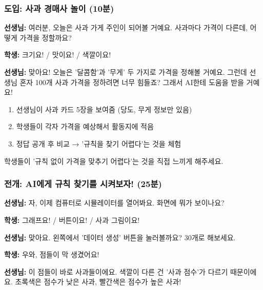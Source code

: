 \documentclass[12pt,a4paper]{article}
\begin{document}
\subsubsection{도입: 사과 경매사 놀이 (10분)}

\begin{tcolorbox}[colback=lightgreen,colframe=applegreen,title=\textbf{【사과 경매사 활동】}]
 \textbf{선생님:} 여러분, 오늘은 사과 가게 주인이 되어볼 거예요. 사과마다 가격이 다른데, 어떻게 가격을 정할까요?

\vspace{0.2cm}
 \textbf{학생:} 크기요! / 맛이요! / 색깔이요!

\vspace{0.2cm}
 \textbf{선생님:} 맞아요! 오늘은 '달콤함'과 '무게' 두 가지로 가격을 정해볼 거예요. 그런데 선생님 혼자 100개 사과 가격을 정하려면 너무 힘들죠? 그래서 AI한테 도움을 받을 거예요!
\end{tcolorbox}

\begin{tcolorbox}[colback=lightyellow,colframe=orange,title=\textbf{\texttwemoji{bullseye} 활동 포인트}]
\begin{enumerate}
    \item 선생님이 사과 카드 5장을 보여줌 (당도, 무게 정보만 있음)
    \item 학생들이 각자 가격을 예상해서 활동지에 적음
    \item 정답 공개 후 비교 → '규칙을 찾기 어렵다'는 것을 체험
\end{enumerate}

학생들이 '규칙 없이 가격을 맞추기 어렵다'는 것을 직접 느끼게 해주세요.
\end{tcolorbox}

\subsubsection{전개: AI에게 규칙 찾기를 시켜보자! (25분)}

\begin{tcolorbox}[colback=lightgray,colframe=gray,title=\textbf{【활동 1: 시뮬레이터 탐험 - 10분】}]
 \textbf{선생님:} 자, 이제 컴퓨터로 시뮬레이터를 열어봐요. 화면에 뭐가 보이나요?

\vspace{0.2cm}
 \textbf{학생:} 그래프요! / 버튼이요! / 사과 그림이요!

\vspace{0.2cm}
 \textbf{선생님:} 맞아요. 왼쪽에서 '데이터 생성' 버튼을 눌러볼까요? 30개로 해보세요.

\vspace{0.2cm}
 \textbf{학생:} 우와, 점들이 막 생겼어요!

\vspace{0.2cm}
 \textbf{선생님:} 이 점들이 바로 사과들이에요. 색깔이 다른 건 '사과 점수'가 다르기 때문이에요. 초록색은 점수가 낮은 사과, 빨간색은 점수가 높은 사과!
\end{tcolorbox}
\end{document}
